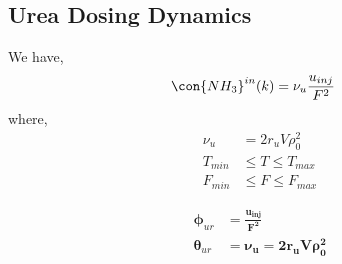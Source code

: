 \subsection{Urea Dosing Dynamics}
We have,
\begin{align}
    \con{NH_3}^{in}(k) &= \nu_u \frac{u_{inj}}{F^2}   \label{eqn::urea_parm}
\end{align}
where,
\begin{align*}
    \nu_u &= 2r_u V \rho^2_0\\
    T_{min} &\leq T \leq T_{max}\\
    F_{min} &\leq F \leq F_{max}
\end{align*}

\begin{align*}
        \pmb \phi_{ur} &= \bm{\frac{u_{inj}}{F^2}}\\
        \pmb \theta_{ur} &= \bm{\nu_u} = \bm{2r_u V \rho^2_0}
\end{align*}
